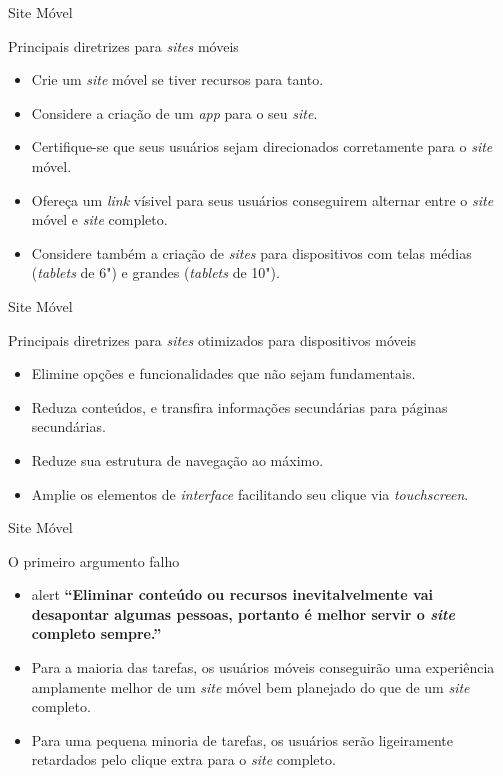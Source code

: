 \begin{frame}{Site Móvel}
\begin{block}{Principais diretrizes para \emph{sites} móveis}
  \begin{itemize}
    \item<1-> Crie um \emph{site} móvel se tiver recursos para tanto.
    \item<2-> Considere a criação de um \emph{app} para o seu \emph{site}.
    \item<3-> Certifique-se que seus usuários sejam direcionados corretamente para o \emph{site} móvel.
    \item<4-> Ofereça um \emph{link} vísivel para seus usuários conseguirem alternar entre o \emph{site} móvel e \emph{site} completo.
    \item<5-> Considere também a criação de \emph{sites} para dispositivos com telas médias (\emph{tablets} de 6") e grandes (\emph{tablets} de 10").
  \end{itemize}
\end{block}
\end{frame}

\begin{frame}{Site Móvel}
\begin{block}{Principais diretrizes para \emph{sites} otimizados para dispositivos móveis}
  \begin{itemize}
    \item<1-> Elimine opções e funcionalidades que não sejam fundamentais.
    \item<2-> Reduza conteúdos, e transfira informações secundárias para páginas secundárias.
    \item<3-> Reduze sua estrutura de navegação ao máximo.
    \item<4-> Amplie os elementos de \emph{interface} facilitando seu clique via \emph{touchscreen}.
  \end{itemize}
\end{block}
\end{frame}

\begin{frame}{Site Móvel}
\begin{block}{O primeiro argumento falho}
  \begin{itemize}
    \item<1->[]
      \begin{beamercolorbox}[sep=1em]{alert}
        \textbf{``Eliminar conteúdo ou recursos inevitalvelmente vai desapontar algumas pessoas, portanto é melhor servir o \emph{site} completo sempre.''}
      \end{beamercolorbox}
    \item<2-> Para a maioria das tarefas, os usuários móveis conseguirão uma experiência amplamente melhor de um \emph{site} móvel bem planejado do que de um \emph{site} completo.
    \item<3-> Para uma pequena minoria de tarefas, os usuários serão ligeiramente retardados pelo clique extra para o \emph{site} completo.
  \end{itemize}
\end{block}
\end{frame}

